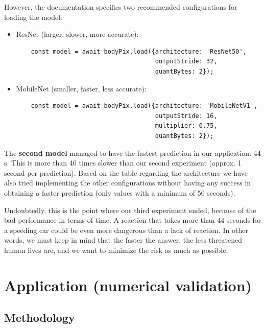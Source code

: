 \documentclass[runningheads,a4paper,11pt]{report}
\begin{document}
However, the documentation specifies two recommended configurations for loading the model:
\begin{itemize}
    \item ResNet (larger, slower, more accurate):

    \begin{lstlisting}
    const model = await bodyPix.load({architecture: 'ResNet50',
                                      outputStride: 32,
                                      quantBytes: 2});

    \end{lstlisting}
    \item MobileNet (smaller, faster, less accurate):
    \begin{lstlisting}
    const model = await bodyPix.load({architecture: 'MobileNetV1',
                                      outputStride: 16,
                                      multiplier: 0.75,
                                      quantBytes: 2});
    \end{lstlisting}
\end{itemize}
The \textbf{second model} managed to have the fastest prediction in our application: 44 s. This is more than 40 times slower than our second experiment (approx. 1 second per prediction). Based on the table regarding the architecture we have also tried implementing the other configurations without having any success in obtaining a faster prediction (only values with a minimum of 50 seconds). 


Undoubtedly, this is the point where our third experiment ended, because of the bad performance in terms of time. A reaction that takes more than 44 seconds for a speeding car could be even more dangerous than a lack of reaction. In other words, we must keep in mind that the faster the answer, the less threatened human lives are, and we want to minimize the risk as much as possible.


\chapter{Application (numerical validation)}
\label{chapter:application}



\section{Methodology}
\label{section:methodology}
\end{document}
